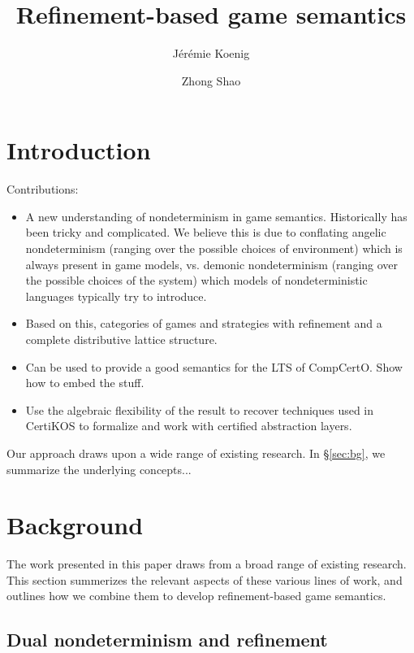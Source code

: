\documentclass[format=sigplan,authordraft]{acmart}
\title{Refinement-based game semantics} %
\author{J\'er\'emie Koenig}
\affiliation{Yale University}
\author{Zhong Shao}
\affiliation{Yale University}
\begin{document}
\maketitle

\section{Introduction} %

Contributions:
\begin{itemize}
\item A new understanding of nondeterminism in game semantics.
  Historically has been tricky and complicated.
  We believe this is due to conflating
  angelic nondeterminism
  (ranging over the possible choices of environment)
  which is always present in game models,
  vs. demonic nondeterminism
  (ranging over the possible choices of the system)
  which models of nondeterministic languages
  typically try to introduce.
\item Based on this,
  categories of games and strategies
  with refinement and a complete distributive lattice structure.
\item Can be used to provide a good semantics
  for the LTS of CompCertO.
  Show how to embed the stuff.
\item Use the algebraic flexibility of the result
  to recover techniques used in CertiKOS
  to formalize and work with
  certified abstraction layers.
\end{itemize}

Our approach draws upon a wide range of existing research.
In \S\ref{sec:bg},
we summarize the underlying concepts...


\section{Background} %


The work presented in this paper
draws from a broad range of existing research.
This section summerizes the relevant aspects
of these various lines of work,
and outlines how we combine them
to develop
refinement-based game semantics.


\subsection{Dual nondeterminism and refinement} \label{sec:refcal} %
\end{document}
